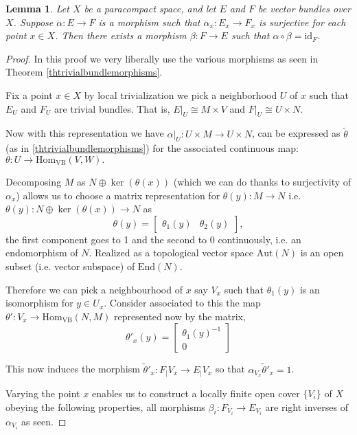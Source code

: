 \documentclass[12pt]{report}
\numberwithin{equation}{section}
\newcommand{\Hom}{{\mathrm{Hom}}}
\newtheorem{lemma}[dummy]{Lemma}
\begin{document}
	\begin{lemma}
		Let \( X \) be a paracompact space, and let \( E \) and \( F \) be vector bundles over \( X \). Suppose \( \alpha: E \to F \) is a morphism such that \( \alpha_x: E_x \to F_x \) is surjective for each point \( x \in X \). Then there exists a morphism \( \beta: F \to E \) such that \( \alpha \circ \beta = \mathrm{id}_F \).
	\end{lemma}
	\begin{proof}
		In this proof we very liberally use the various morphisms as seen in Theorem \ref{thtrivialbundlemorphisms}.
		
		Fix a point $x \in X$ by local trivialization we pick a neighborhood $U$ of $x$ such that $E_U$ and $F_U$ are trivial bundles. That is, $E|_U \cong M \times V$ and $F|_U \cong U \times N$.
		
		Now with this representation we have $\alpha|_U: U \times M \to U \times N$, can be expressed as $\tilde{\theta}$ (as in \ref{thtrivialbundlemorphisms}) for the associated continuous map:
		\(
		\theta: U \to \mathrm{Hom}_{\mathrm{VB}}(V, W).
		\)
		
		Decomposing $M$ as $N\oplus \ker (\theta (x))$ (which we can do thanks to surjectivity of $\alpha_x$) allows us to choose a matrix representation for $\theta(y):M\to N$ i.e. $\theta(y):N \oplus \ker (\theta( x)) \to N$ as
		\[
		\theta(y) = 
		\begin{bmatrix} 
			\theta_1(y) & \theta_2(y) 
		\end{bmatrix},
		\]
		the first component goes to 1 and the second to 0 continuously, i.e. an endomorphism of $N$. Realized as a topological vector space $\mathrm{Aut}(N)$ is an open subset (i.e. vector subspace) of $\mathrm{End}(N)$. 
		
		Therefore we can pick a neighbourhood of $x$ say $V_x$ such that $\theta_1(y)$ is an isomorphism for $y \in U_x$. Consider associated to this the map $\theta': V_x \to \Hom_{\mathrm{VB}}(N,M)$ represented now by the matrix,
		\[ \theta'_x(y)=\begin{bmatrix}
			\theta_1(y)^{-1}\\0
		\end{bmatrix} \]
			
		This now induces the morphism $\tilde{\theta}'_x: F_|{V_x} \to E_|{V_x}$ so that $\alpha_{V_x} \tilde{\theta}'_x = 1$. 
		
		Varying the point $x$ enables us to construct a locally finite open cover $\{V_i\}$ of $X$ obeying the following properties, all morphisms $\beta_i: F_{V_i} \to E_{V_i}$ are right inverses of $\alpha_{V_i}$ as seen.
		

\end{proof}
\end{document}
